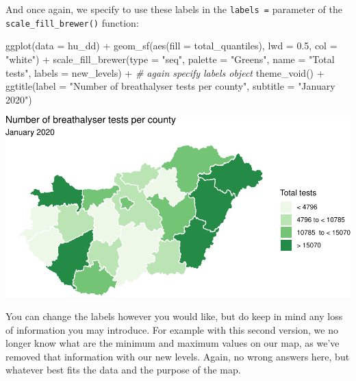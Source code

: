 \documentclass[
]{book}
\makeatletter
\newenvironment{Shaded}{\begin{snugshade}}{\end{snugshade}}
\newcommand{\AttributeTok}[1]{\textcolor[rgb]{0.61,0.61,0.61}{#1}}
\newcommand{\CommentTok}[1]{\textcolor[rgb]{0.37,0.37,0.37}{\textit{#1}}}
\newcommand{\FloatTok}[1]{\textcolor[rgb]{0.06,0.06,0.06}{#1}}
\newcommand{\FunctionTok}[1]{\textcolor[rgb]{0,0,0}{#1}}
\newcommand{\NormalTok}[1]{#1}
\newcommand{\SpecialCharTok}[1]{\textcolor[rgb]{0,0,0}{#1}}
\newcommand{\StringTok}[1]{\textcolor[rgb]{0.5,0.5,0.5}{#1}}
\newenvironment{kframe}{%
\medskip{}
\setlength{\fboxsep}{.8em}
 \def\at@end@of@kframe{}%
 \ifinner\ifhmode%
  \def\at@end@of@kframe{\end{minipage}}%
  \begin{minipage}{\columnwidth}%
 \fi\fi%
 \def\FrameCommand##1{\hskip\@totalleftmargin \hskip-\fboxsep
 \colorbox{shadecolor}{##1}\hskip-\fboxsep
     \hskip-\linewidth \hskip-\@totalleftmargin \hskip\columnwidth}%
 \MakeFramed {\advance\hsize-\width
   \@totalleftmargin\z@ \linewidth\hsize
   \@setminipage}}%
 {\par\unskip\endMakeFramed%
 \at@end@of@kframe}
\renewenvironment{Shaded}{\begin{kframe}}{\end{kframe}}
\makeatother
\begin{document}
And once again, we specify to use these labels in the \texttt{labels\ =} parameter of the \texttt{scale\_fill\_brewer()} function:

\begin{Shaded}
\begin{Highlighting}[]
\FunctionTok{ggplot}\NormalTok{(}\AttributeTok{data =}\NormalTok{ hu\_dd) }\SpecialCharTok{+} 
  \FunctionTok{geom\_sf}\NormalTok{(}\FunctionTok{aes}\NormalTok{(}\AttributeTok{fill =}\NormalTok{ total\_quantiles), }
          \AttributeTok{lwd =} \FloatTok{0.5}\NormalTok{, }\AttributeTok{col =} \StringTok{"white"}\NormalTok{) }\SpecialCharTok{+} 
  \FunctionTok{scale\_fill\_brewer}\NormalTok{(}\AttributeTok{type =} \StringTok{"seq"}\NormalTok{, }\AttributeTok{palette =} \StringTok{"Greens"}\NormalTok{, }
                    \AttributeTok{name =} \StringTok{"Total tests"}\NormalTok{, }
                    \AttributeTok{labels =}\NormalTok{ new\_levels) }\SpecialCharTok{+} \CommentTok{\# again specify labels object}
  \FunctionTok{theme\_void}\NormalTok{() }\SpecialCharTok{+} 
  \FunctionTok{ggtitle}\NormalTok{(}\AttributeTok{label =} \StringTok{"Number of breathalyser tests per county"}\NormalTok{, }
          \AttributeTok{subtitle =} \StringTok{"January 2020"}\NormalTok{)}
\end{Highlighting}
\end{Shaded}

\includegraphics{crime_mapping_files/figure-latex/newnewlabelsplot-1.pdf}

You can change the labels however you would like, but do keep in mind any loss of information you may introduce. For example with this second version, we no longer know what are the minimum and maximum values on our map, as we've removed that information with our new levels. Again, no wrong answers here, but whatever best fits the data and the purpose of the map.
\end{document}

